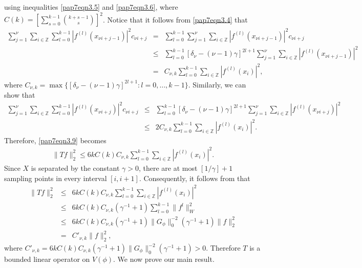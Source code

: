 \documentclass[a4paper,12pt,reqno]{amsart}
\theoremstyle{plain}
\numberwithin{equation}{section}
\theoremstyle{definition}
\newcommand{\ds}{\displaystyle}
\begin{document}
using inequalities \eqref{pap7eqn3.5} and \eqref{pap7eqn3.6}, where $C(k)=\left[\ds\sum\limits_{s=0}^{k-1}{k+s-1\choose s}\right]^2$. Notice that it follows from \eqref{pap7eqn3.4} that
\begin{eqnarray}
\sum\limits_{j=1}^{\nu}\ds\sum\limits_{i\in\mathbb{Z}}
\ds\sum\limits_{l=0}^{k-1}|f^{(l)}(x_{\nu i+j-1})|^2 c_{\nu i+j}&=&\ds\sum\limits_{l=0}^{k-1}\sum\limits_{j=1}^{\nu}\ds\sum\limits_{i\in\mathbb{Z}}
|f^{(l)}(x_{\nu i+j-1})|^2 c_{\nu i+j}\nonumber\\
&\leq&\ds\sum\limits_{l=0}^{k-1}[\delta_\nu-(\nu-1)\gamma]^{2l+1}\sum\limits_{j=1}^{\nu}\ds\sum\limits_{i\in\mathbb{Z}}
|f^{(l)}(x_{\nu i+j-1})|^2 \nonumber\\
&=&C_{\nu,k}\ds\sum\limits_{l=0}^{k-1}\ds\sum\limits_{i\in\mathbb{Z}}
|f^{(l)}(x_{i})|^2,
\end{eqnarray}
where
$C_{\nu,k}=\max\{[\delta_\nu-(\nu-1)\gamma]^{2l+1}:l=0,\dots,k-1\}$. Similarly, we can show that
\begin{eqnarray}
\sum\limits_{j=1}^{\nu}\ds\sum\limits_{i\in\mathbb{Z}}
\ds\sum\limits_{l=0}^{k-1}|f^{(l)}(x_{\nu i+j})|^2 c_{\nu i+j}
&\leq&\ds\sum\limits_{l=0}^{k-1}[\delta_\nu-(\nu-1)\gamma]^{2l+1}\sum\limits_{j=1}^{\nu}\ds\sum\limits_{i\in\mathbb{Z}}
|f^{(l)}(x_{\nu i+j})|^2 \nonumber\\
&\leq&2C_{\nu,k}\ds\sum\limits_{l=0}^{k-1}\ds\sum\limits_{i\in\mathbb{Z}}
|f^{(l)}(x_{i})|^2.
\end{eqnarray}
Therefore, \eqref{pap7eqn3.9}  becomes
\begin{eqnarray}
\|T f\|_2^2\leq6kC(k)C_{\nu,k}\ds\sum\limits_{l=0}^{k-1}\ds\sum\limits_{i\in\mathbb{Z}}|f^{(l)}(x_{i})|^2.
\end{eqnarray}
Since $X$ is separated by the constant $\gamma>0$, there are at most $[1/\gamma]+1$ sampling points in every interval $[i,i+1]$. Consequently,  it follows from \cite{AlGr1}  that 
\begin{eqnarray}\label{pap7eqn3.13}
\|T f\|_2^2&\leq&6kC(k)C_{\nu,k}\ds\sum\limits_{l=0}^{k-1}\ds\sum\limits_{i\in\mathbb{Z}}|f^{(l)}(x_{i})|^2\\
&\leq&6kC(k)C_{\nu,k}(\gamma^{-1}+1)\sum\limits_{l=0}^{k-1}\|f^{l}\|_W^2\nonumber\\
&\leq&6kC(k)C_{\nu,k}(\gamma^{-1}+1)\|G_\phi\|_0^{-2}(\gamma^{-1}+1)\|f\|_2^2\label{pap7eqn3.14}\\
&=&C'_{\nu,k}\|f\|_2^2,\nonumber
\end{eqnarray}
where $C'_{\nu,k}=6kC(k)C_{\nu,k}(\gamma^{-1}+1)\|G_\phi\|_0^{-2}(\gamma^{-1}+1)>0$. Therefore $T$ is a bounded linear operator on $V(\phi)$. We now prove our main result.
\end{document}
